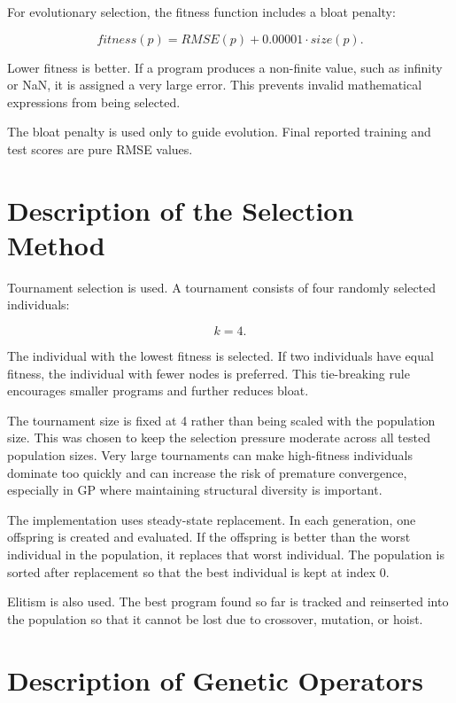 \documentclass{article}
\begin{document}
For evolutionary selection, the fitness function includes a bloat penalty:

\begin{equation}
fitness(p) = RMSE(p) + 0.00001 \cdot size(p).
\end{equation}

Lower fitness is better. If a program produces a non-finite value, such as infinity or NaN, it is assigned a very large error. This prevents invalid mathematical expressions from being selected.

The bloat penalty is used only to guide evolution. Final reported training and test scores are pure RMSE values.

\section{Description of the Selection Method}

Tournament selection is used. A tournament consists of four randomly selected individuals:

\begin{equation}
k = 4.
\end{equation}

The individual with the lowest fitness is selected. If two individuals have equal fitness, the individual with fewer nodes is preferred. This tie-breaking rule encourages smaller programs and further reduces bloat.

The tournament size is fixed at 4 rather than being scaled with the population size. This was chosen to keep the selection pressure moderate across all tested population sizes. Very large tournaments can make high-fitness individuals dominate too quickly and can increase the risk of premature convergence, especially in GP where maintaining structural diversity is important.

The implementation uses steady-state replacement. In each generation, one offspring is created and evaluated. If the offspring is better than the worst individual in the population, it replaces that worst individual. The population is sorted after replacement so that the best individual is kept at index 0.

Elitism is also used. The best program found so far is tracked and reinserted into the population so that it cannot be lost due to crossover, mutation, or hoist.

\section{Description of Genetic Operators}
\end{document}
